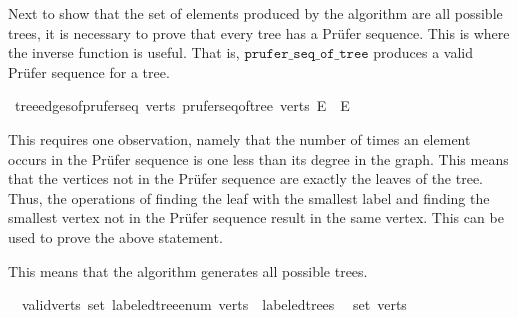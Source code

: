 Next to show that the set of elements produced by the algorithm are all possible trees, it is necessary to prove that every tree has a Prüfer sequence.
This is where the inverse function is useful.
That is, $\texttt{prufer\_seq\_of\_tree}$ produces a valid Prüfer sequence for a tree.

\begin{isabellebox}
    \isamarkupfalse%
    \ {\isachardoublequoteopen}tree{\isacharunderscore}{\kern0pt}edges{\isacharunderscore}{\kern0pt}of{\isacharunderscore}{\kern0pt}prufer{\isacharunderscore}{\kern0pt}seq\ verts\ {\isacharparenleft}{\kern0pt}prufer{\isacharunderscore}{\kern0pt}seq{\isacharunderscore}{\kern0pt}of{\isacharunderscore}{\kern0pt}tree\ verts\ E{\isacharparenright}{\kern0pt}\ {\isacharequal}{\kern0pt}\ E{\isachardoublequoteclose}
\end{isabellebox}

This requires one observation, namely that the number of times an element occurs in the Prüfer sequence is one less than its degree in the graph.
This means that the vertices not in the Prüfer sequence are exactly the leaves of the tree.
Thus, the operations of finding the leaf with the smallest label and finding the smallest vertex not in the Prüfer sequence result in the same vertex.
This can be used to prove the above statement.

This means that the algorithm generates all possible trees.

\begin{isabellebox}
    \isamarkupfalse%
    \ {\isacharparenleft}{\kern0pt}\ valid{\isacharunderscore}{\kern0pt}verts{\isacharparenright}{\kern0pt}\ {\isachardoublequoteopen}set\ {\isacharparenleft}{\kern0pt}labeled{\isacharunderscore}{\kern0pt}tree{\isacharunderscore}{\kern0pt}enum\ verts{\isacharparenright}{\kern0pt}\ {\isacharequal}{\kern0pt}\ labeled{\isacharunderscore}{\kern0pt}trees\isanewline
    \ \ {\isacharparenleft}{\kern0pt}set\ verts{\isacharparenright}{\kern0pt}{\isachardoublequoteclose}
\end{isabellebox}

